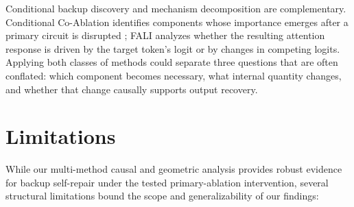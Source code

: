 \documentclass[10pt]{article} %
\begin{document}
Conditional backup discovery and mechanism decomposition are complementary.
Conditional Co-Ablation identifies components whose importance emerges after
a primary circuit is disrupted \citep{gong2026conditional}; FALI analyzes
whether the resulting attention response is driven by the target token's logit
or by changes in competing logits. Applying both classes of methods could
separate three questions that are often conflated: which component becomes
necessary, what internal quantity changes, and whether that change causally
supports output recovery.

\section{Limitations}
\label{sec:limitations}

While our multi-method causal and geometric analysis provides robust evidence for backup self-repair under the tested primary-ablation intervention, several structural limitations bound the scope and generalizability of our findings:
\end{document}
